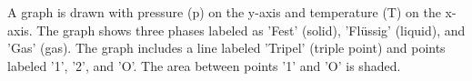 A graph is drawn with pressure (p) on the y-axis and temperature (T) on the x-axis. The graph shows three phases labeled as 'Fest' (solid), 'Flüssig' (liquid), and 'Gas' (gas). The graph includes a line labeled 'Tripel' (triple point) and points labeled '1', '2', and 'O'. The area between points '1' and 'O' is shaded.